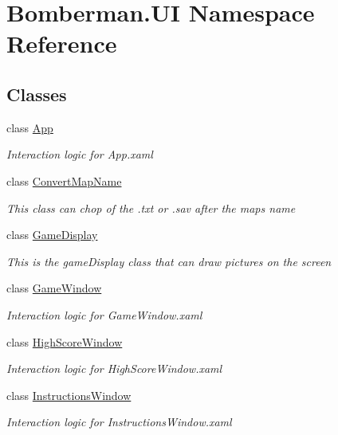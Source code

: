 \hypertarget{namespace_bomberman_1_1_u_i}{}\section{Bomberman.\+UI Namespace Reference}
\label{namespace_bomberman_1_1_u_i}
\subsection*{Classes}
\begin{DoxyCompactItemize}
\item 
class \mbox{\hyperlink{class_bomberman_1_1_u_i_1_1_app}{App}}
\begin{DoxyCompactList}\small\item\em Interaction logic for App.\+xaml \end{DoxyCompactList}\item 
class \mbox{\hyperlink{class_bomberman_1_1_u_i_1_1_convert_map_name}{Convert\+Map\+Name}}
\begin{DoxyCompactList}\small\item\em This class can chop of the .txt or .sav after the maps name \end{DoxyCompactList}\item 
class \mbox{\hyperlink{class_bomberman_1_1_u_i_1_1_game_display}{Game\+Display}}
\begin{DoxyCompactList}\small\item\em This is the game\+Display class that can draw pictures on the screen \end{DoxyCompactList}\item 
class \mbox{\hyperlink{class_bomberman_1_1_u_i_1_1_game_window}{Game\+Window}}
\begin{DoxyCompactList}\small\item\em Interaction logic for Game\+Window.\+xaml \end{DoxyCompactList}\item 
class \mbox{\hyperlink{class_bomberman_1_1_u_i_1_1_high_score_window}{High\+Score\+Window}}
\begin{DoxyCompactList}\small\item\em Interaction logic for High\+Score\+Window.\+xaml \end{DoxyCompactList}\item 
class \mbox{\hyperlink{class_bomberman_1_1_u_i_1_1_instructions_window}{Instructions\+Window}}
\begin{DoxyCompactList}\small\item\em Interaction logic for Instructions\+Window.\+xaml \end{DoxyCompactList}\item 

\end{DoxyCompactItemize}
